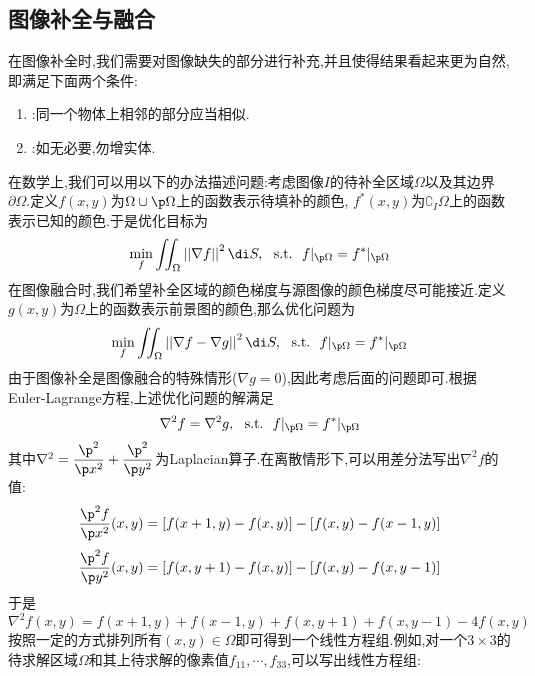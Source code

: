 \documentclass{ctexart}
\begin{document}
\subsection{图像补全与融合}
在图像补全时,我们需要对图像缺失的部分进行补充,并且使得结果看起来更为自然,即满足下面两个条件:
\begin{enumerate}[label=\tbf{\arabic*.},topsep=0pt,parsep=0pt,itemsep=0pt,partopsep=0pt]
    \item {}:同一个物体上相邻的部分应当相似.
    \item {}:如无必要,勿增实体.
\end{enumerate}
\indent 在数学上,我们可以用以下的办法描述问题:考虑图像$I$的待补全区域$\Omega$以及其边界$\partial \Omega$.定义$f(x,y)$为$\Omega\cup\p\Omega$上的函数表示待填补的颜色, $f^\ast(x,y)$为$\complement_I\Omega$上的函数表示已知的颜色.于是优化目标为
\[\min_f\iint_{\Omega}\left|\left|\nabla f\right|\right|^2\di S,\ \ \text{s.t.}\ \ f|_{\p\Omega}=f^\ast|_{\p\Omega}\]
在图像融合时,我们希望补全区域的颜色梯度与源图像的颜色梯度尽可能接近.定义$g(x,y)$为$\Omega$上的函数表示前景图的颜色,那么优化问题为
\[\min_f\iint_{\Omega}\left|\left|\nabla f-\nabla g\right|\right|^2\di S,\ \ \text{s.t.}\ \ f|_{\p\Omega}=f^\ast|_{\p\Omega}\]
由于图像补全是图像融合的特殊情形($\nabla g=0$),因此考虑后面的问题即可.根据Euler-Lagrange方程,上述优化问题的解满足
\[\nabla^2f=\nabla^2g,\ \ \text{s.t.}\ \ f|_{\p\Omega}=f^\ast|_{\p\Omega}\]
其中$\nabla^2=\dfrac{\p^2}{\p x^2}+\dfrac{\p^2}{\p y^2}$为Laplacian算子.在离散情形下,可以用差分法写出$\nabla^2f$的值:
\[\dfrac{\p^2f}{\p x^2}(x,y)=[f(x+1,y)-f(x,y)]-[f(x,y)-f(x-1,y)]\]
\[\dfrac{\p^2f}{\p y^2}(x,y)=[f(x,y+1)-f(x,y)]-[f(x,y)-f(x,y-1)]\]
于是
\[\nabla^2 f(x,y)=f(x+1,y)+f(x-1,y)+f(x,y+1)+f(x,y-1)-4f(x,y)\]
按照一定的方式排列所有$(x,y)\in\Omega$即可得到一个线性方程组.例如,对一个$3\times3$的待求解区域$\Omega$和其上待求解的像素值$f_{11},\cdots,f_{33}$,可以写出线性方程组:
\end{document}
